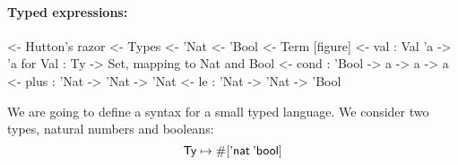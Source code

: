\paragraph{Typed expressions:}

\begin{wstructure}
<- Hutton's razor
    <- Types
        <- 'Nat
        <- 'Bool
    <- Term [figure]
        <- val : Val 'a -> 'a  for Val : Ty -> Set, mapping to Nat and Bool
        <- cond : 'Bool -> a -> a -> a
        <- plus : 'Nat -> 'Nat -> 'Nat
        <- le : 'Nat -> 'Nat -> 'Bool
\end{wstructure}

\newcommand{\Ty}{\C{Ty}}
\newcommand{\Ebool}{\etag{\CN{bool}}}
\newcommand{\Enat}{\etag{\CN{nat}}}

\newcommand{\SYMBEval}{\etag{\CN{val}}\xspace}
\newcommand{\Eval}[1]{\SYMBEval\:#1}
\newcommand{\SYMBEcond}{\etag{\CN{cond}}\xspace}
\newcommand{\Econd}[3]{\SYMBEcond\:#1\:#2\:#3}
\newcommand{\SYMBEplus}{\etag{\CN{plus}}\xspace}
\newcommand{\Eplus}[2]{\SYMBEplus\:#1\:#2}
\newcommand{\SYMBEle}{\etag{\CN{le}}\xspace}
\newcommand{\Ele}[2]{\SYMBEle\:#1\:#2}

\newcommand{\SYMBVal}{\F{Val}\xspace}
\newcommand{\Val}[1]{\SYMBVal\:#1}
\newcommand{\SYMBVar}{\F{Var}\xspace}
\newcommand{\Var}[2]{\SYMBVar_{#1} #2}

\newcommand{\HExprD}{\C{ExprD}}
\newcommand{\HExprAD}{\C{ExprAD}}
\newcommand{\HExprID}{\C{ExprID}}
\newcommand{\HExprVarD}[1]{\C{ExprD}_{\F{Var},#1}}
\newcommand{\HExprFreeD}{\C{ExprD}^{\C{Free}}}
\newcommand{\HExprAFreeD}{\C{ExprAD}^{\C{Free}}}

We are going to define a syntax for a small typed language. We
consider two types, natural numbers and booleans:
%
\[
\Ty \mapsto \EnumT{\sqr{\Enat\: \Ebool}}
\]

